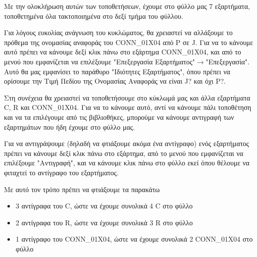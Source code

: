 \documentclass[a4paper]{article}
\begin{document}
Με την ολοκλήρωση αυτών των τοποθετήσεων, έχουμε στο φύλλο μας 7 εξαρτήματα, τοποθετημένα όλα τακτοποιημένα στο δεξί τμήμα του φύλλου.

\begin{figure}
  \begin{center}
    \label{fig:kicad-main}
  \end{center}
\end{figure}

Για λόγους ευκολίας ανάγνωση του κυκλώματος, θα χρειαστεί να αλλάξουμε το πρόθεμα της ονομασίας αναφοράς του CONN\_01X04 από P σε J. Για να το κάνουμε αυτό πρέπει να κάνουμε δεξί κλικ πάνω στο εξάρτημα CONN\_01X04, και από το μενού που εμφανίζεται να επιλέξουμε "Επεξεργασία Εξαρτήματος"$\rightarrow$"Επεξεργασία". Αυτό θα μας εμφανίσει το παράθυρο "Ιδιότητες Εξαρτήματος", όπου πρέπει να ορίσουμε την Τιμή Πεδίου της Ονομασίας Αναφοράς να είναι J? και όχι P?.

\begin{figure}
  \begin{center}
    \label{fig:kicad-main}
  \end{center}
\end{figure}


Στη συνέχεια θα χρειαστεί να τοποθετήσουμε στο κύκλωμά μας και άλλα εξαρτήματα C, R και CONN\_01X04. Για να το κάνουμε αυτό, αντί να κάνουμε πάλι τοποθέτηση και να τα επιλέγουμε από τις βιβλιοθήκες, μπορούμε να κάνουμε αντιγραφή των εξαρτημάτων που ήδη έχουμε στο φύλλο μας. 

Για να αντιγράψουμε (δηλαδή να φτιάξουμε ακόμα ένα αντίγραφο) ενός εξαρτήματος πρέπει να κάνουμε δεξί κλικ πάνω στο εξάρτημα, από το μενού που εμφανίζεται να επιλέξουμε "Αντιγραφή", και να κάνουμε κλικ πάνω στο φύλλο εκεί όπου θέλουμε να φιταχτεί το αντίγραφο του εξαρτήματος. 

\begin{figure}
  \begin{center}
    \label{fig:kicad-main}
  \end{center}
\end{figure}

Με αυτό τον τρόπο πρέπει να φτιάξουμε τα παρακάτω

\begin{itemize}
    \item 3 αντίγραφα του C, ώστε να έχουμε συνολικά 4 C στο φύλλο
    \item 2 αντίγραφα του R, ώστε να έχουμε συνολικά 3 R στο φύλλο
    \item 1 αντίγραφο του CONN\_01X04, ώστε να έχουμε συνολικά 2 CONN\_01X04 στο φύλλο
\end{itemize}
\end{document}

